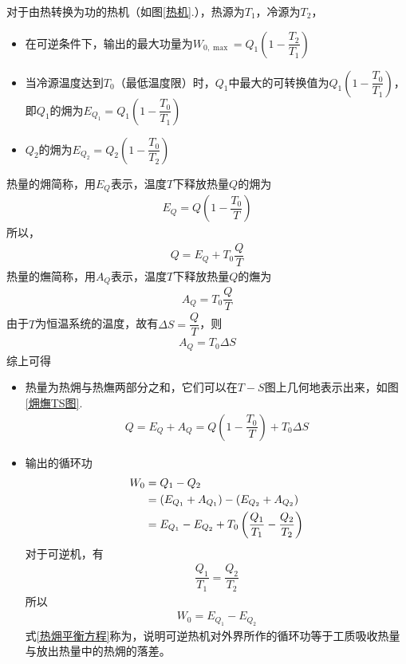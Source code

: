 \noindent 对于由热转换为功的热机（如图\ref{热机}.），热源为$T_1$，冷源为$T_2$，
\begin{itemize}
	\item 在可逆条件下，输出的最大功量为$W_{0, \max} = Q_1 \left(1 - \dfrac{T_2}{T_1}\right)$
	\item 当冷源温度达到$T_0$（最低温度限）时，$Q_1$中最大的可转换值为$Q_1 \left(1 - \dfrac{T_0}{T_1}\right)$，即$Q_1$的㶲为$E_{Q_1} = Q_1 \left(1 - \dfrac{T_0}{T_1}\right)$
	\item $Q_2$的㶲为$E_{Q_2} = Q_2 \left(1 - \dfrac{T_0}{T_2}\right)$
\end{itemize}
热量的㶲简称，用$E_Q$表示，温度$T$下释放热量$Q$的㶲为
\begin{align}
	E_Q = Q \left(1 - \dfrac{T_0}{T} \right)
\end{align}
所以，
\begin{align}
	Q = E_Q  + T_0 \dfrac{Q}{T}
\end{align}
热量的㷻简称，用$A_Q$表示，温度$T$下释放热量$Q$的㷻为
\begin{align}
	A_Q = T_0 \dfrac{Q}{T}
\end{align}
	由于$T$为恒温系统的温度，故有$\Delta S = \dfrac{Q}{T}$，则
	\begin{align}
		A_Q = T_0 \Delta S
	\end{align}
综上可得
\begin{itemize}
	\item 热量为热㶲与热㷻两部分之和，它们可以在$T-S$图上几何地表示出来，如图\ref{㶲㷻TS图}.
\begin{align}
	Q = E_Q + A_Q = Q \left(1 - \dfrac{T_0}{T} \right) + T_0 \Delta S
\end{align}
	\item 输出的循环功
	\begin{align}
		W_ 0 &= Q_1 - Q_2\notag \\
		& = \left(E_{Q_1} + A_{Q_1}\right) - \left(E_{Q_2} + A_{Q_2}\right) \notag \\
		& = E_{Q_1} - E_{Q_2} + T_0 \left(\dfrac{Q_1}{T_1} - \dfrac{Q_2}{T_2}\right)
	\end{align}
	对于可逆机，有
	\begin{align*}
		\dfrac{Q_1}{T_1} = \dfrac{Q_2}{T_2}
	\end{align*}
	所以
	\begin{align}
		W_0 = E_{Q_1} - E_{Q_2}
		\label{热㶲平衡方程}
	\end{align}
	式\eqref{热㶲平衡方程}称为，说明可逆热机对外界所作的循环功等于工质吸收热量与放出热量中的热㶲的落差。
\end{itemize}

